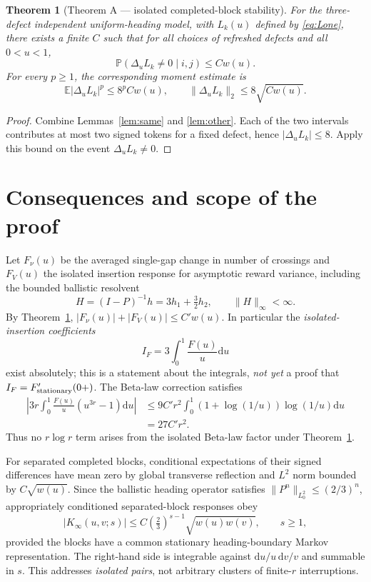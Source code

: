 \documentclass[11pt]{article}
\newtheorem{theorem}{Theorem}[section]
\theoremstyle{remark}\newtheorem{remark}[theorem]{Remark}
\newcommand{\E}{\mathbb E}
\newcommand{\Prb}{\mathbb P}
\newcommand{\dd}{\mathrm d}
\begin{document}
\begin{theorem}[Theorem A --- isolated completed-block stability]\label{thm:A}
For the three-defect independent uniform-heading model, with $L_k(u)$ defined by \eqref{eq:Lone}, there exists a finite $C$ such that for all choices of refreshed defects and all $0<u<1$,
\begin{equation}\boxed{\Prb(\Delta_uL_k\ne0\mid i,j)\le Cw(u).}\label{eq:A}
\end{equation}
For every $p\ge1$, the corresponding moment estimate is
\begin{equation}\label{eq:Amoment}
\E|\Delta_uL_k|^p\le8^pCw(u),\qquad
\|\Delta_uL_k\|_2\le8\sqrt{Cw(u)}.
\end{equation}
\end{theorem}
\begin{proof}Combine Lemmas~\ref{lem:same} and \ref{lem:other}. Each of the two intervals contributes at most two signed tokens for a fixed defect, hence $|\Delta_uL_k|\le8$. Apply this bound on the event $\Delta_uL_k\ne0$.\end{proof}

\section{Consequences and scope of the proof}
Let $F_\nu(u)$ be the averaged single-gap change in number of crossings and $F_V(u)$ the isolated insertion response for asymptotic reward variance, including the bounded ballistic resolvent
\[H=(I-P)^{-1}h=3h_1+\tfrac32h_2,\qquad \|H\|_\infty<\infty.\]
By Theorem~\ref{thm:A}, $|F_\nu(u)|+|F_V(u)|\le C' w(u)$. In particular the \emph{isolated-insertion coefficients}
\[I_F=3\int_0^1\frac{F(u)}u\dd u\]
exist absolutely; this is a statement about the integrals, \emph{not yet} a proof that $I_F=F_{\rm stationary}'(0+)$. The Beta-law correction satisfies
\begin{align}
\left|3r\int_0^1\frac{F(u)}u(u^{3r}-1)\dd u\right|
&\le9C'r^2\int_0^1(1+\log(1/u))\log(1/u)\dd u\\
&=27C'r^2.\label{eq:betaO2}
\end{align}
Thus no $r\log r$ term arises from the isolated Beta-law factor under Theorem~\ref{thm:A}.

For separated completed blocks, conditional expectations of their signed differences have mean zero by global transverse reflection and $L^2$ norm bounded by $C\sqrt{w(u)}$. Since the ballistic heading operator satisfies $\|P^n\|_{L^2_0}\le(2/3)^n$, appropriately conditioned separated-block responses obey
\begin{equation}\label{eq:separated}
|K_\infty(u,v;s)|\le C\left(\tfrac23\right)^{s-1}\sqrt{w(u)w(v)},\qquad s\ge1,
\end{equation}
provided the blocks have a common stationary heading-boundary Markov representation. The right-hand side is integrable against $\dd u/u\,\dd v/v$ and summable in $s$. This addresses \emph{isolated pairs}, not arbitrary clusters of finite-$r$ interruptions.
\end{document}
